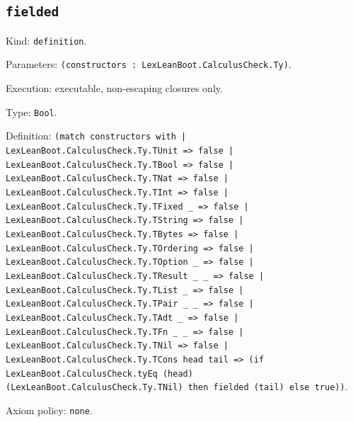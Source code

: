 \documentclass[11pt]{article}
\begin{document}
\subsection*{\texttt{fielded}}
\noindent Kind: \texttt{definition}.\par
\noindent Parameters: \texttt{(constructors : LexLeanBoot.CalculusCheck.Ty)}.\par
\noindent Execution: executable, non-escaping closures only.\par
\noindent Type: \texttt{Bool}.\par
\noindent Definition: \texttt{(match constructors with | LexLeanBoot.CalculusCheck.Ty.TUnit => false | LexLeanBoot.CalculusCheck.Ty.TBool => false | LexLeanBoot.CalculusCheck.Ty.TNat => false | LexLeanBoot.CalculusCheck.Ty.TInt => false | LexLeanBoot.CalculusCheck.Ty.TFixed \_ => false | LexLeanBoot.CalculusCheck.Ty.TString => false | LexLeanBoot.CalculusCheck.Ty.TBytes => false | LexLeanBoot.CalculusCheck.Ty.TOrdering => false | LexLeanBoot.CalculusCheck.Ty.TOption \_ => false | LexLeanBoot.CalculusCheck.Ty.TResult \_ \_ => false | LexLeanBoot.CalculusCheck.Ty.TList \_ => false | LexLeanBoot.CalculusCheck.Ty.TPair \_ \_ => false | LexLeanBoot.CalculusCheck.Ty.TAdt \_ => false | LexLeanBoot.CalculusCheck.Ty.TFn \_ \_ => false | LexLeanBoot.CalculusCheck.Ty.TNil => false | LexLeanBoot.CalculusCheck.Ty.TCons head tail => (if LexLeanBoot.CalculusCheck.tyEq (head) (LexLeanBoot.CalculusCheck.Ty.TNil) then fielded (tail) else true))}.\par
\noindent Axiom policy: \texttt{none}.\par
\end{document}
